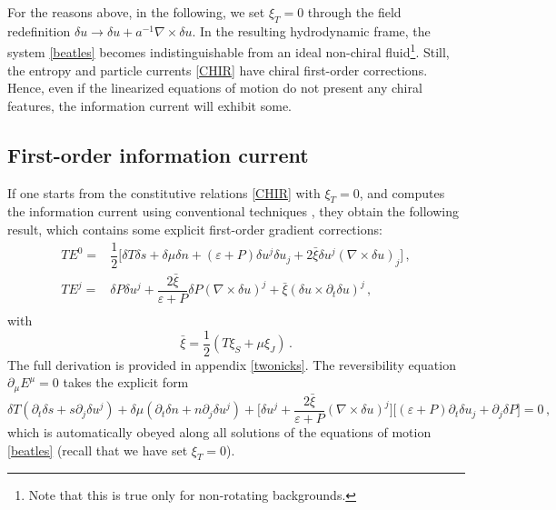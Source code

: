 \documentclass[a4paper, amsfonts, amssymb, amsmath, reprint, showkeys, nofootinbib, twoside,notitlepage,onecolumn,preprintnumbers]{revtex4-2}
\theoremstyle{definition}
\theoremstyle{theorem}
\theoremstyle{corollary}
\begin{document}
For the reasons above, in the following, we set $\xi_T=0$ through the field redefinition $\delta u \rightarrow \delta u +a^{-1} \nabla {\times} \delta u$. In the resulting hydrodynamic frame, the system \eqref{beatles} becomes indistinguishable from an ideal non-chiral fluid\footnote{Note that this is true only for non-rotating backgrounds.}.  Still, the entropy and particle currents \eqref{CHIR} have chiral first-order corrections. Hence, even if the linearized equations of motion do not present any chiral features, the information current will exhibit some.

\subsection{First-order information current}

If one starts from the constitutive relations \eqref{CHIR} with $\xi_T=0$, and computes the information current using conventional techniques \cite{GavassinoGibbs2021,GavassinoGENERIC2022}, they obtain the following result, which contains some explicit first-order gradient corrections:
\begin{equation}\label{grzi}
    \begin{split}
TE^0 ={}& \dfrac{1}{2} \bigg[ \delta T \delta s+\delta \mu \delta n + (\varepsilon {+} P)\delta u^j \delta u_j+2\bar{\xi} \delta u^j (\nabla {\times} \delta u)_j \bigg] \, , \\
TE^j ={}& \delta P \delta u^j + \dfrac{2\bar{\xi}}{\varepsilon{+}P} \delta P (\nabla {\times} \delta u)^j + \bar{\xi} (\delta u {\times} \partial_t \delta u)^j \, , \\
    \end{split}
\end{equation}
with
\begin{equation} \label{xibar}
    \bar{\xi}=\dfrac{1}{2} (T\xi_S{+}\mu \xi_J) \, .
\end{equation}
The full derivation is provided in appendix \ref{twonicks}. The reversibility equation $\partial_\mu E^\mu=0$ takes the explicit form
\begin{equation}
    \delta T (\partial_t \delta s +s \partial_j \delta u^j) + \delta \mu (\partial_t \delta n +n\partial_j \delta u^j)+ \bigg[ \delta u^j + \dfrac{2\bar{\xi}}{\varepsilon{+}P} (\nabla {\times} \delta u)^j \bigg] \bigg[ (\varepsilon{+}P)\partial_t \delta u_j + \partial_j \delta P \bigg]=0 \, ,
\end{equation}
which is automatically obeyed along all solutions of the equations of motion \eqref{beatles} (recall that we have set $\xi_T=0$).
\end{document}
